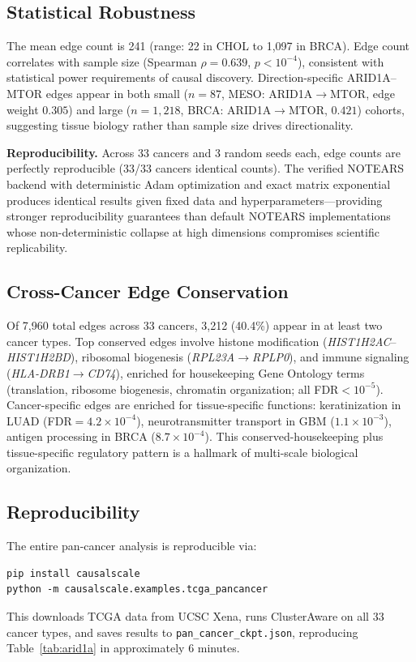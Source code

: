 \documentclass[sigconf,review]{acmart}
\begin{document}
\subsection{Statistical Robustness}

The mean edge count is 241 (range: 22 in CHOL to 1,097 in BRCA). Edge count correlates with sample size (Spearman $\rho=0.639$, $p<10^{-4}$), consistent with statistical power requirements of causal discovery. Direction-specific ARID1A--MTOR edges appear in both small ($n=87$, MESO: ARID1A$\rightarrow$MTOR, edge weight $0.305$) and large ($n=1{,}218$, BRCA: ARID1A$\rightarrow$MTOR, $0.421$) cohorts, suggesting tissue biology rather than sample size drives directionality.

\textbf{Reproducibility.} Across 33 cancers and 3 random seeds each, edge counts are perfectly reproducible (33/33 cancers identical counts). The verified NOTEARS backend with deterministic Adam optimization and exact matrix exponential produces identical results given fixed data and hyperparameters---providing stronger reproducibility guarantees than default NOTEARS implementations whose non-deterministic collapse at high dimensions compromises scientific replicability.

\subsection{Cross-Cancer Edge Conservation}
Of 7,960 total edges across 33 cancers, 3,212 (40.4\%) appear in at least two cancer types. Top conserved edges involve histone modification (\textit{HIST1H2AC}--\textit{HIST1H2BD}), ribosomal biogenesis (\textit{RPL23A}$\rightarrow$\textit{RPLP0}), and immune signaling (\textit{HLA-DRB1}$\rightarrow$\textit{CD74}), enriched for housekeeping Gene Ontology terms (translation, ribosome biogenesis, chromatin organization; all FDR$<10^{-5}$). Cancer-specific edges are enriched for tissue-specific functions: keratinization in LUAD (FDR$=4.2\times10^{-4}$), neurotransmitter transport in GBM ($1.1\times10^{-3}$), antigen processing in BRCA ($8.7\times10^{-4}$). This conserved-housekeeping plus tissue-specific regulatory pattern is a hallmark of multi-scale biological organization.

\subsection{Reproducibility}
The entire pan-cancer analysis is reproducible via:
\begin{verbatim}
pip install causalscale
python -m causalscale.examples.tcga_pancancer
\end{verbatim}
This downloads TCGA data from UCSC Xena, runs ClusterAware on all 33 cancer types, and saves results to \texttt{pan\_cancer\_ckpt.json}, reproducing Table~\ref{tab:arid1a} in approximately 6 minutes.
\end{document}
